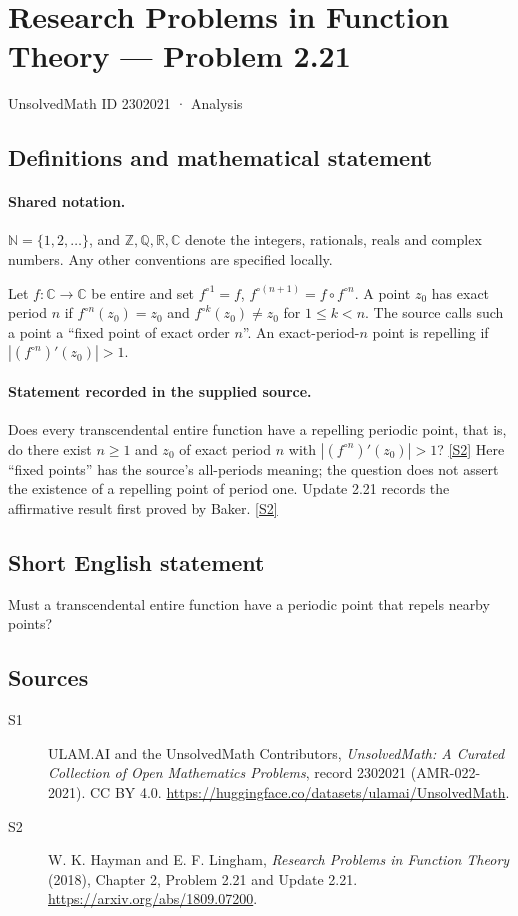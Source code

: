 \documentclass[11pt]{article}
\newcommand{\sref}[2]{\hyperlink{source:#1:#2}{[S#2]}}
\begin{document}
\setcounter{section}{2302020}
\section{Research Problems in Function Theory — Problem 2.21}\label{2302021}
{\small\sffamily UnsolvedMath ID 2302021 · Analysis}
\subsection{Definitions and mathematical statement}

\paragraph{Shared notation.}$\mathbb N=\{1,2,\ldots\}$, and $\mathbb Z,\mathbb Q,\mathbb R,\mathbb C$ denote the integers, rationals, reals and complex numbers. Any other conventions are specified locally.


Let $f:\mathbb C\to\mathbb C$ be entire and set $f^{\circ1}=f$, $f^{\circ(n+1)}=f\circ f^{\circ n}$.
A point $z_0$ has exact period $n$ if $f^{\circ n}(z_0)=z_0$ and $f^{\circ k}(z_0)\ne z_0$ for $1\le k<n$.
The source calls such a point a ``fixed point of exact order $n$''.
An exact-period-$n$ point is repelling if $|(f^{\circ n})'(z_0)|>1$.

\paragraph{Statement recorded in the supplied source.}
Does every transcendental entire function have a repelling periodic point, that is, do there exist $n\ge1$ and $z_0$ of exact period $n$ with $|(f^{\circ n})'(z_0)|>1$? \sref{2302021}{2}
Here ``fixed points'' has the source's all-periods meaning; the question does not assert the existence of a repelling point of period one. Update 2.21 records the affirmative result first proved by Baker. \sref{2302021}{2}
\subsection{Short English statement}
Must a transcendental entire function have a periodic point that repels nearby points?
\subsection{Sources}
\begin{description}
\item[\hypertarget{source:2302021:1}{S1}] ULAM.AI and the UnsolvedMath Contributors, \emph{UnsolvedMath: A Curated Collection of Open Mathematics Problems}, record 2302021 (AMR-022-2021). CC BY 4.0. \url{https://huggingface.co/datasets/ulamai/UnsolvedMath}.
\item[\hypertarget{source:2302021:2}{S2}] W. K. Hayman and E. F. Lingham, \emph{Research Problems in Function Theory} (2018), Chapter 2, Problem 2.21 and Update 2.21. \url{https://arxiv.org/abs/1809.07200}.
\end{description}
\label{end:2302021}
\end{document}

